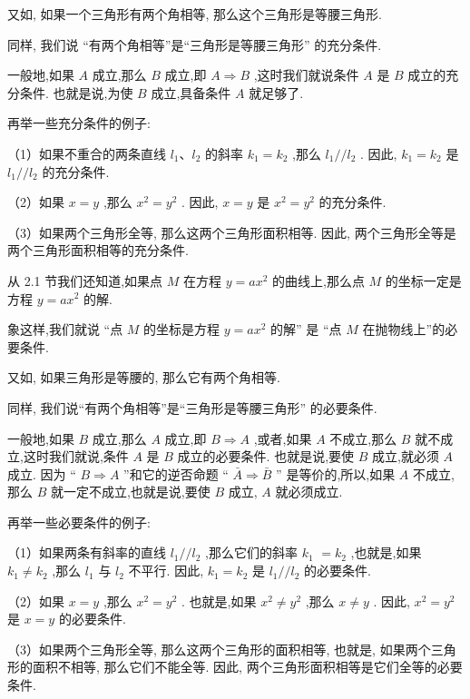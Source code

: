 \documentclass[lang=cn,newtx,10pt,scheme=chinese]{elegantbook}
\begin{document}
又如, 如果一个三角形有两个角相等, 那么这个三角形是等腰三角形.

同样, 我们说 “有两个角相等”是“三角形是等腰三角形” 的充分条件.

一般地,如果 \(A\) 成立,那么 \(B\) 成立,即 \(A \Rightarrow B\) ,这时我们就说条件 \(A\) 是 \(B\) 成立的充分条件. 也就是说,为使 \(B\) 成立,具备条件 \(A\) 就足够了.

再举一些充分条件的例子:

（1）如果不重合的两条直线 \({l}_{1}\text{、}{l}_{2}\) 的斜率 \({k}_{1} = {k}_{2}\) ,那么 \({l}_{1}//{l}_{2}\) . 因此, \({k}_{1} = {k}_{2}\) 是 \({l}_{1}//{l}_{2}\) 的充分条件.

（2）如果 \(x = y\) ,那么 \({x}^{2} = {y}^{2}\) . 因此, \(x = y\) 是 \({x}^{2} = {y}^{2}\) 的充分条件.

（3）如果两个三角形全等, 那么这两个三角形面积相等. 因此, 两个三角形全等是两个三角形面积相等的充分条件.

从 2.1 节我们还知道,如果点 \(M\) 在方程 \(y = a{x}^{2}\) 的曲线上,那么点 \(M\) 的坐标一定是方程 \(y = a{x}^{2}\) 的解.

象这样,我们就说 “点 \(M\) 的坐标是方程 \(y = a{x}^{2}\) 的解” 是 “点 \(M\) 在抛物线上”的必要条件.

又如, 如果三角形是等腰的, 那么它有两个角相等.

同样, 我们说“有两个角相等”是“三角形是等腰三角形” 的必要条件.

一般地,如果 \(B\) 成立,那么 \(A\) 成立,即 \(B \Rightarrow A\) ,或者,如果 \(A\) 不成立,那么 \(B\) 就不成立,这时我们就说,条件 \(A\) 是 \(B\) 成立的必要条件. 也就是说,要使 \(B\) 成立,就必须 \(A\) 成立. 因为 “ \(B \Rightarrow A\) ”和它的逆否命题 “ \(\bar{A} \Rightarrow \bar{B}\) ” 是等价的,所以,如果 \(A\) 不成立,那么 \(B\) 就一定不成立,也就是说,要使 \(B\) 成立, \(A\) 就必须成立.

再举一些必要条件的例子:

（1）如果两条有斜率的直线 \({l}_{1}//{l}_{2}\) ,那么它们的斜率 \({k}_{1}\) \(= {k}_{2}\) ,也就是,如果 \({k}_{1} \neq {k}_{2}\) ,那么 \({l}_{1}\) 与 \({l}_{2}\) 不平行. 因此, \({k}_{1} = {k}_{2}\) 是 \({l}_{1}//{l}_{2}\) 的必要条件.

（2）如果 \(x = y\) ,那么 \({x}^{2} = {y}^{2}\) . 也就是,如果 \({x}^{2} \neq {y}^{2}\) ,那么 \(x \neq y\) . 因此, \({x}^{2} = {y}^{2}\) 是 \(x = y\) 的必要条件.

（3）如果两个三角形全等, 那么这两个三角形的面积相等, 也就是, 如果两个三角形的面积不相等, 那么它们不能全等. 因此, 两个三角形面积相等是它们全等的必要条件.
\end{document}
